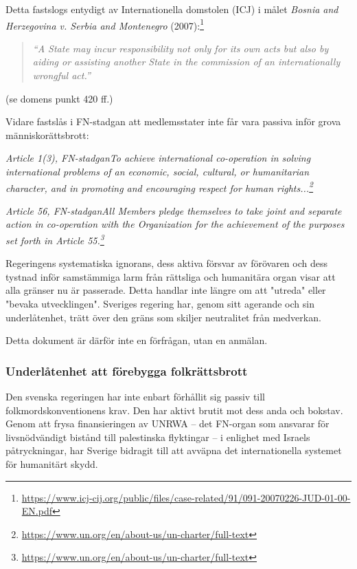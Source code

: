\documentclass[12pt]{article}
\newcommand{\lagrum}[1]{\par\vspace{3mm}\textit{#1}\par\vspace{5mm}}
\begin{document}
Detta fastslogs entydigt av Internationella domstolen (ICJ) i målet \textit{Bosnia and Herzegovina v. Serbia and Montenegro} (2007):\footnote{\url{https://www.icj-cij.org/public/files/case-related/91/091-20070226-JUD-01-00-EN.pdf}}

\begin{quote}
\textit{“A State may incur responsibility not only for its own acts but also by aiding or assisting another State in the commission of an internationally wrongful act.”}
\end{quote}

(se domens punkt 420 ff.)

Vidare fastslås i FN-stadgan att medlemsstater inte får vara passiva inför grova människorättsbrott:

\lagrum{Article 1(3), FN-stadgan\quad To achieve international co-operation in solving international problems of an economic, social, cultural, or humanitarian character, and in promoting and encouraging respect for human rights...\footnote{\url{https://www.un.org/en/about-us/un-charter/full-text}}}

\lagrum{Article 56, FN-stadgan\quad All Members pledge themselves to take joint and separate action in co-operation with the Organization for the achievement of the purposes set forth in Article 55.\footnote{\url{https://www.un.org/en/about-us/un-charter/full-text}}}

Regeringens systematiska ignorans, dess aktiva försvar av förövaren och dess tystnad inför samstämmiga larm från rättsliga och humanitära organ visar att alla gränser nu är passerade. Detta handlar inte längre om att "utreda" eller "bevaka utvecklingen". Sveriges regering har, genom sitt agerande och sin underlåtenhet, trätt över den gräns som skiljer neutralitet från medverkan.

Detta dokument är därför inte en förfrågan, utan en anmälan.

\subsubsection*{Underlåtenhet att förebygga folkrättsbrott}

Den svenska regeringen har inte enbart förhållit sig passiv till folkmordskonventionens krav. Den har aktivt brutit mot dess anda och bokstav. Genom att frysa finansieringen av UNRWA – det FN-organ som ansvarar för livsnödvändigt bistånd till palestinska flyktingar – i enlighet med Israels påtryckningar, har Sverige bidragit till att avväpna det internationella systemet för humanitärt skydd.
\end{document}
